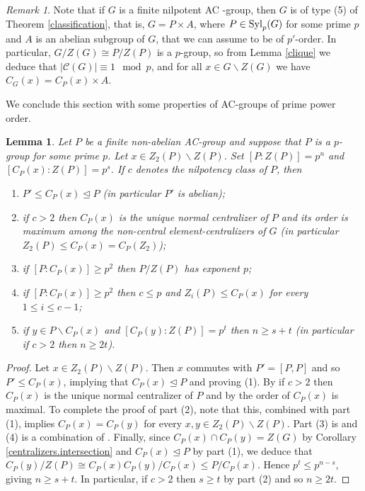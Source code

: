 \documentclass[12pt]{amsart}
\theoremstyle{definition}
\theoremstyle{remark}
\newtheorem{remark}[definition]{Remark}
\theoremstyle{plain}
\theoremstyle{plain}
\theoremstyle{plain}
\theoremstyle{plain}
\newtheorem{lemma}[definition]{Lemma}
\theoremstyle{plain}
\theoremstyle{remark}
\theoremstyle{remark}
\theoremstyle{definition}
\newcommand{\Syl}{\mathrm{Syl}}
\newcommand{\norm}{\mathrel{\unlhd}}
\def \Syl {\hbox {\rm Syl}}
\begin{document}
\begin{remark}
Note that if $G$ is a finite nilpotent AC -group, then $G$ is of type (5) of Theorem \ref{classification}, that is, $G = P \times A$, where $P \in \Syl_p(G)$ for some prime $p$ and $A$ is an abelian subgroup of $G$, that we can assume to be  of $p'$-order. In particular, $G/Z(G) \cong P/Z(P)$ is a $p$-group, so from Lemma \ref{clique} we deduce that $|\mathcal{C}(G)| \equiv 1 \mod p$, and for all $x \in G\backslash Z(G)$ we have $C_G(x) = C_P(x) \times A$.
\end{remark}

We conclude this section with some properties of AC-groups of prime power order.

\begin{lemma}\label{lem:p-groups}
Let $P$ be a finite non-abelian AC-group and suppose that $P$ is a $p$-group for some prime $p$. Let $x \in Z_2(P) \backslash Z(P)$. Set $[P \colon Z(P)] = p^n$ and $[C_P(x) \colon Z(P)] = p^s$. If $c$ denotes the nilpotency class of $P$, then
\begin{enumerate}
\item $P' \leq C_P(x) \norm P$ (in particular $P'$ is abelian);
\item if $c > 2$ then $C_P(x)$ is the unique normal centralizer of $P$ and its order is maximum among the non-central element-centralizers of $G$ (in particular $Z_2(P) \leq C_P(x) = C_P(Z_2)$);
\item if $[P \colon C_P(x)] \geq p^2$ then $P/Z(P)$ has exponent $p$;
\item if $[P \colon C_P(x)] \geq p^2$ then $c \leq p$ and $Z_i(P) \leq C_P(x)$ for every $1 \leq i \leq c-1$;
\item if $y \in P \backslash C_P(x)$ and $[C_P(y) \colon Z(P)] = p^t$ then $n\geq s+t$ (in particular if $c > 2$ then $n \geq 2t$).
\end{enumerate}

\end{lemma}

\begin{proof}
Let $x \in Z_2(P) \backslash Z(P)$. Then $x$ commutes with $P'=[P,P]$ and so $P' \leq C_P(x)$, implying that $C_P(x) \norm P$ and proving (1).
By \cite[Lemma 3.8]{Rocke} if $c > 2$ then $C_P(x)$ is the unique normal centralizer of $P$ and by \cite[Proposition 2.7]{non.comm.p.groups} the order of $C_P(x)$ is maximal. To complete the proof of part (2), note that this, combined with part (1), implies $C_P(x)=C_P(y)$ for every $x,y \in Z_2(P) \backslash Z(P)$.
Part (3) is \cite[Theorem 3.13(b)]{Rocke}  and (4) is a combination of \cite[Lemma 3.14(c) and Lemma 3.15]{Rocke}.
Finally, since $C_P(x) \cap C_P(y) = Z(G)$ by Corollary \ref{centralizers.intersection} and $C_P(x) \norm P$ by part (1), we deduce that $C_P(y)/Z(P) \cong C_P(x)C_P(y)/C_P(x) \leq P/C_P(x)$. Hence $p^t \leq p^{n-s}$, giving $n \geq s +t$. In particular, if $c >2$ then $s \geq t$ by part (2) and so $n \geq 2t$.  
\end{proof}
\end{document}
